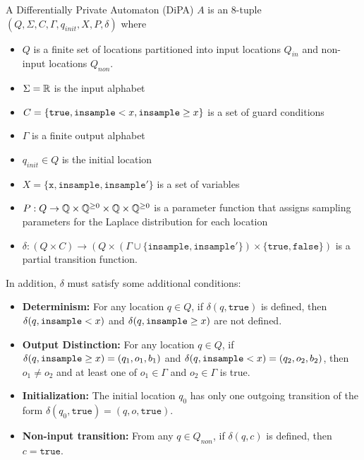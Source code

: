 \begin{defn}
    A Differentially Private Automaton (DiPA) $A$ is an 8-tuple $(Q, \Sigma, C, \Gamma, q_{init}, X, P, \delta)$ where
    \begin{itemize}
        \item $Q$ is a finite set of locations partitioned into input locations $Q_{in}$ and non-input locations $Q_{non}$. 
        \item $\Sigma = \mathbb{R}$ is the input alphabet
        \item $C = \{\texttt{true}, \texttt{insample} < x, \texttt{insample}\geq x\}$ is a set of guard conditions
        \item $\Gamma$ is a finite output alphabet
        \item $q_{init}\in Q$ is the initial location
        \item $X = \{\texttt{x}, \texttt{insample}, \texttt{insample}'\}$ is a set of variables
        \item $P: Q\to \mathbb{Q}\times \mathbb{Q}^{\geq 0}\times \mathbb{Q}\times  \mathbb{Q}^{\geq 0}$ is a parameter function that assigns sampling parameters for the Laplace distribution for each location
        \item $\delta:(Q\times C)\to (Q\times (\Gamma \cup \{\texttt{insample}, \texttt{insample}'\})\times \{\texttt{true}, \texttt{false}\})$ is a partial transition function. 
    \end{itemize}
    In addition, $\delta$ must satisfy some additional conditions:
    \begin{itemize}
        \item \textbf{Determinism:} For any location $q\in Q$, if $\delta(q,\texttt{true})$ is defined, then $\delta(q,\texttt{insample} < x)$ and $\delta(q,\texttt{insample}\geq x)$ are not defined. 

        \item \textbf{Output Distinction:} For any location $q\in Q$, if $\delta(q, \texttt{insample}\geq x) = (q_1, o_1, b_1)$ and $\delta(q, \texttt{insample} < x) = (q_2, o_2, b_2)$, then $o_1\neq o_2$ and at least one of $o_1\in \Gamma$ and $o_2\in \Gamma$ is true.

        \item \textbf{Initialization:} The initial location $q_0$ has only one outgoing transition of the form $\delta(q_0, \texttt{true}) = (q, o, \texttt{true})$.

        \item \textbf{Non-input transition:} From any $q\in Q_{non}$, if $\delta(q, c)$ is defined, then $c=\texttt{true}$.
    \end{itemize}
\end{defn}

